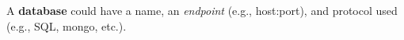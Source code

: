 A \textbf{database} could have a name, an \textit{endpoint} (e.g., host:port),
and protocol used (e.g., SQL, mongo, etc.).

